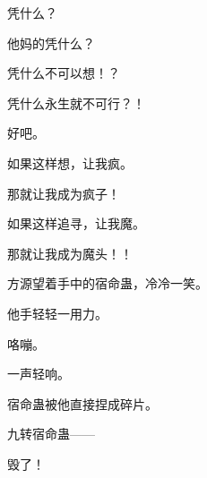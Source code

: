 \begin{this_body}
凭什么？

他妈的凭什么？

凭什么不可以想！？

凭什么永生就不可行？！

好吧。

如果这样想，让我疯。

那就让我成为疯子！

如果这样追寻，让我魔。

那就让我成为魔头！！

方源望着手中的宿命蛊，冷冷一笑。

他手轻轻一用力。

咯嘣。

一声轻响。

宿命蛊被他直接捏成碎片。

九转宿命蛊——

毁了！

\end{this_body}

